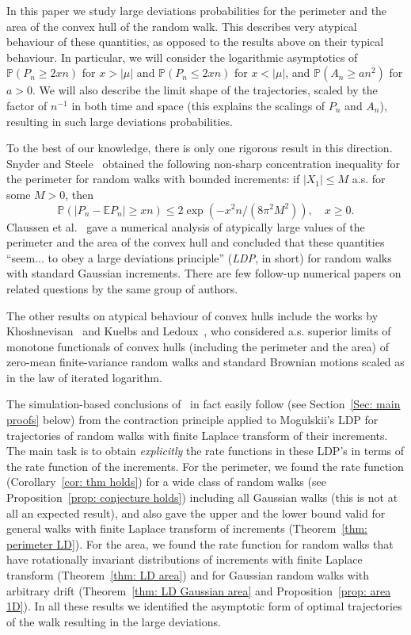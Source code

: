 \documentclass[AHL,Unicode,published]{cedram}
\newcommand{\E}{\mathbb{E}}
\newcommand{\Pbb}{\mathbb{P}}
\begin{document}
In this paper we study large deviations probabilities for the perimeter and the area of the convex hull of the random walk. This describes very atypical behaviour of these quantities, as opposed to the results above on their typical behaviour. In particular, we will consider the logarithmic asymptotics of $\Pbb(P_n \ge 2 x n)$ for $x> |\mu|$ and $\Pbb(P_n \le 2 x n)$ for $x<|\mu|$, and $\Pbb(A_n \ge a n^2)$ for $a > 0$. We will also describe the limit shape of the trajectories, scaled by the factor of $n^{-1}$ in both time and space (this explains the scalings of $P_n$ and $A_n$), resulting in such large deviations probabilities.

To the best of our knowledge, there is only one rigorous result in this direction. Snyder and Steele~\cite{SnyderSteele} obtained the following non-sharp concentration inequality for the perimeter for random walks with bounded increments: if $|X_1| \le M$ a.s. for some $M >0$, then
\[
\Pbb(|P_n - \E P_n| \ge xn) \le 2\exp\left(- x^2 n/\left(8 \pi^2 M^2\right)\right), \quad x \ge 0.
\]
Claussen et al.~\cite{Claussen+} gave a numerical analysis of atypically large values of the perimeter and the area of the convex hull and concluded that these quantities ``seem... to obey a large deviations principle'' (\emph{LDP}, in short) for random walks with standard Gaussian increments. There are few follow-up numerical papers on related questions by the same group of authors.

The other results on atypical behaviour of convex hulls include the works by Khoshnevisan~\cite{Khoshnevisan} and Kuelbs and Ledoux~\cite{KuelbsLedoux}, who considered a.s. superior limits of monotone functionals of convex hulls (including the perimeter and the area) of zero-mean finite-variance random walks and standard Brownian motions scaled as in the law of iterated logarithm.



The simulation-based conclusions of~\cite{Claussen+} in fact easily follow (see Section~\ref{Sec: main proofs} below) from the contraction principle applied to Mogulskii's LDP for trajectories of random walks with finite Laplace transform of their increments. The main task is to obtain \emph{explicitly} the rate functions in these LDP's in terms of the rate function of the increments. For the perimeter, we found the rate function (Corollary~\ref{cor: thm holds}) for a wide class of random walks (see Proposition~\ref{prop: conjecture holds}) including all Gaussian walks (this is not at all an expected result), and also gave the upper and the lower bound valid for general walks with finite Laplace transform of increments (Theorem~\ref{thm: perimeter LD}). For the area, we found the rate function for random walks that have rotationally invariant distributions of increments with finite Laplace transform (Theorem~\ref{thm: LD area}) and for Gaussian random walks with arbitrary drift (Theorem~\ref{thm: LD Gaussian area} and Proposition~\ref{prop: area 1D}). In all these results we identified the asymptotic form of optimal trajectories of the walk resulting in the large deviations.
\end{document}
